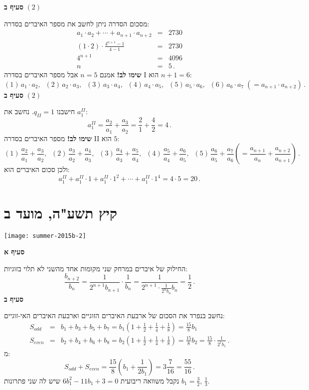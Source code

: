 \textbf{סעיף ב}
$(2)$

מסכום הסדרה ניתן לחשב את מספר האיברים בסדרה:
\begin{eqnarray*}
a_1\cdot a_2 + \cdots + a_{n+1} \cdot a_{n+2} &=& 2730\\
(1\cdot 2)\cdot \frac{4^{n+1}-1}{4-1}&=&2730\\
4^{n+1}&=&4096\\
n&=&5\,.
\end{eqnarray*}
\textbf{שימו לב!}
אמנם
$n=5$
אבל מספר האיברים בסדרה I הוא 
$n+1=6$:
\[
(1)\, a_1\cdot a_2,\;\; (2)\,a_2\cdot a_3,\;\;(3)\, a_3\cdot a_4,\;\; (4)\,a_4\cdot a_5,\;\; (5)\,a_5\cdot a_6,\;\; (6)\,a_6\cdot a_7 \;(= a_{n+1}\cdot a_{n+2})\,.
\]
\textbf{סעיף ב}
$(2)$

חישבנו
$q_{II}=1$.
נחשב את
$a_1^{II}$:
\[
a_1^{II}=\frac{a_{2}}{a_1} + \frac{a_{3}}{a_{2}}=\frac{2}{1}+\frac{4}{2}=4\,.
\]
\textbf{שימו לב!}
מספר האיברים בסדרה II הוא 
$5$:
\[
(1)\,\frac{a_2}{a_1}+\frac{a_3}{a_2},\;\;
(2)\,\frac{a_3}{a_2}+\frac{a_4}{a_3},\;\;
(3)\,\frac{a_4}{a_3}+\frac{a_5}{a_4},\;\;
(4)\,\frac{a_5}{a_4}+\frac{a_6}{a_5},\;\;
(5)\,\frac{a_6}{a_5}+\frac{a_7}{a_6} \left(= \frac{a_{n+1}}{a_n}+\frac{a_{n+2}}{a_{n+1}}\right)\,.
\]
ולכן סכום האיברים הוא:
\[
a_1^{II}+a_1^{II}\cdot 1 + a_1^{II}\cdot 1^2 + \cdots + a_1^{II}\cdot 1^4 = 4\cdot 5=20\,.
\]


\np

\section{קיץ תשע"ה, מועד ב}

\begin{center}
\texttt{[image: summer-2015b-2]}
\end{center}
\vspace{-2ex}

\textbf{סעיף א}

החילוק של איברים במרחק שני מקומות אחד מהשני לא תלוי בזוגיות:
\[
\frac{b_{n+2}}{b_n} = \frac{1}{2^{n+1}b_{n+1}}\cdot\frac{1}{b_n}=\frac{1}{2^{n+1}\cdot\displaystyle\frac{1}{2^nb_n}{b_n}}= \frac{1}{2}\,.
\]
\textbf{סעיף ב}

 נחשב בנפרד את הסכום של ארבעת האיברים הזוגיים וארבעת האיברים האי-זוגיים:
\begin{eqnarray*}
S_{\mathit{odd}} &=& b_1+b_3+b_5+b_7=b_1\left(1 + \frac{1}{2} + \frac{1}{4} +\frac{1}{8}\right)=\frac{15}{8}b_1\\
S_{\mathit{even}} &=& b_2+b_4+b_6+b_8=b_2\left(1 + \frac{1}{2} + \frac{1}{4} +\frac{1}{8}\right)=\frac{15}{8}b_2=\frac{15}{8}\cdot\frac{1}{2^1b_1}\,.
\end{eqnarray*}
מ:
\[
S_{\mathit{odd}} + S_{\mathit{even}} =\frac{15}{8}\left(b_1+\frac{1}{2b_1}\right)= 3\frac{7}{16}=\frac{55}{16}\,.
\]
נקבל משוואה ריבועית 
$6b_1^2-11b_1+3=0$
שיש לה שני פתרונות 
$b_1=\frac{3}{2},\,\frac{1}{3}$.


